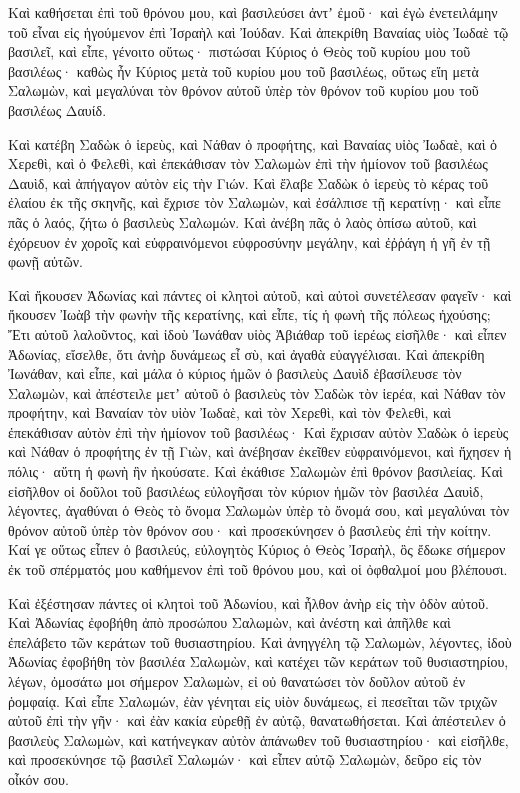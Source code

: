 {Καὶ καθήσεται ἐπὶ τοῦ θρόνου μου, καὶ βασιλεύσει ἀντʼ ἐμοῦ· καὶ ἐγὼ ἐνετειλάμην τοῦ εἶναι εἰς ἡγούμενον ἐπὶ Ἰσραὴλ καὶ Ἰούδαν.
Καὶ ἀπεκρίθη Βαναίας υἱὸς Ἰωδαὲ τῷ βασιλεῖ, καὶ εἶπε, γένοιτο οὕτως· πιστώσαι Κύριος ὁ Θεὸς τοῦ κυρίου μου τοῦ βασιλέως·
καθὼς ἦν Κύριος μετὰ τοῦ κυρίου μου τοῦ βασιλέως, οὕτως εἴη μετὰ Σαλωμὼν, καὶ μεγαλύναι τὸν θρόνον αὐτοῦ ὑπὲρ τὸν θρόνον τοῦ κυρίου μου τοῦ βασιλέως Δαυίδ.
\par }{\PP {}Καὶ κατέβη Σαδὼκ ὁ ἱερεὺς, καὶ Νάθαν ὁ προφήτης, καὶ Βαναίας υἱὸς Ἰωδαὲ, καὶ ὁ Χερεθὶ, καὶ ὁ Φελεθὶ, καὶ ἐπεκάθισαν τὸν Σαλωμὼν ἐπὶ τὴν ἡμίονον τοῦ βασιλέως Δαυὶδ, καὶ ἀπήγαγον αὐτὸν εἰς τὴν Γιών.
Καὶ ἔλαβε Σαδὼκ ὁ ἱερεὺς τὸ κέρας τοῦ ἐλαίου ἐκ τῆς σκηνῆς, καὶ ἔχρισε τὸν Σαλωμὼν, καὶ ἐσάλπισε τῇ κερατίνῃ· καὶ εἶπε πᾶς ὁ λαός, ζήτω ὁ βασιλεὺς Σαλωμών.
Καὶ ἀνέβη πᾶς ὁ λαὸς ὀπίσω αὐτοῦ, καὶ ἐχόρευον ἐν χοροῖς καὶ εὐφραινόμενοι εὐφροσύνην μεγάλην, καὶ ἐῤῥάγη ἡ γῆ ἐν τῇ φωνῇ αὐτῶν.
\par }{\PP {}Καὶ ἤκουσεν Ἀδωνίας καὶ πάντες οἱ κλητοὶ αὐτοῦ, καὶ αὐτοὶ συνετέλεσαν φαγεῖν· καὶ ἤκουσεν Ἰωὰβ τὴν φωνὴν τῆς κερατίνης, καὶ εἶπε, τίς ἡ φωνὴ τῆς πόλεως ἠχούσης;
Ἔτι αὐτοῦ λαλοῦντος, καὶ ἰδοὺ Ἰωνάθαν υἱὸς Ἀβιάθαρ τοῦ ἱερέως εἰσῆλθε· καὶ εἶπεν Ἀδωνίας, εἴσελθε, ὅτι ἀνὴρ δυνάμεως εἶ σὺ, καὶ ἀγαθὰ εὐαγγέλισαι.
Καὶ ἀπεκρίθη Ἰωνάθαν, καὶ εἶπε, καὶ μάλα ὁ κύριος ἡμῶν ὁ βασιλεὺς Δαυὶδ ἐβασίλευσε τὸν Σαλωμὼν,
καὶ ἀπέστειλε μετʼ αὐτοῦ ὁ βασιλεὺς τὸν Σαδὼκ τὸν ἱερέα, καὶ Νάθαν τὸν προφήτην, καὶ Βαναίαν τὸν υἱὸν Ἰωδαὲ, καὶ τὸν Χερεθὶ, καὶ τὸν Φελεθὶ, καὶ ἐπεκάθισαν αὐτὸν ἐπὶ τὴν ἡμίονον τοῦ βασιλέως·
Καὶ ἔχρισαν αὐτὸν Σαδὼκ ὁ ἱερεὺς καὶ Νάθαν ὁ προφήτης ἐν τῇ Γιὼν, καὶ ἀνέβησαν ἐκεῖθεν εὐφραινόμενοι, καὶ ἤχησεν ἡ πόλις· αὕτη ἡ φωνὴ ἣν ἠκούσατε.
Καὶ ἐκάθισε Σαλωμὼν ἐπὶ θρόνον βασιλείας.
Καὶ εἰσῆλθον οἱ δοῦλοι τοῦ βασιλέως εὐλογῆσαι τὸν κύριον ἡμῶν τὸν βασιλέα Δαυὶδ, λέγοντες, ἀγαθύναι ὁ Θεὸς τὸ ὄνομα Σαλωμὼν ὑπὲρ τὸ ὄνομά σου, καὶ μεγαλύναι τὸν θρόνον αὐτοῦ ὑπὲρ τὸν θρόνον σου· καὶ προσεκύνησεν ὁ βασιλεὺς ἐπὶ τὴν κοίτην.
Καί γε οὕτως εἶπεν ὁ βασιλεύς, εὐλογητὸς Κύριος ὁ Θεὸς Ἰσραὴλ, ὃς ἔδωκε σήμερον ἐκ τοῦ σπέρματός μου καθήμενον ἐπὶ τοῦ θρόνου μου, καὶ οἱ ὀφθαλμοί μου βλέπουσι.
\par }{\PP {}Καὶ ἐξέστησαν πάντες οἱ κλητοὶ τοῦ Ἀδωνίου, καὶ ἦλθον ἀνὴρ εἰς τὴν ὁδὸν αὐτοῦ.
Καὶ Ἀδωνίας ἐφοβήθη ἀπὸ προσώπου Σαλωμὼν, καὶ ἀνέστη καὶ ἀπῆλθε καὶ ἐπελάβετο τῶν κεράτων τοῦ θυσιαστηρίου.
Καὶ ἀνηγγέλη τῷ Σαλωμὼν, λέγοντες, ἰδοὺ Ἀδωνίας ἐφοβήθη τὸν βασιλέα Σαλωμὼν, καὶ κατέχει τῶν κεράτων τοῦ θυσιαστηρίου, λέγων, ὀμοσάτω μοι σήμερον Σαλωμὼν, εἰ οὐ θανατώσει τὸν δοῦλον αὐτοῦ ἐν ῥομφαίᾳ.
Καὶ εἶπε Σαλωμών, ἐὰν γένηται εἰς υἱὸν δυνάμεως, εἰ πεσεῖται τῶν τριχῶν αὐτοῦ ἐπὶ τὴν γῆν· καὶ ἐὰν κακία εὑρεθῇ ἐν αὐτῷ, θανατωθήσεται.
Καὶ ἀπέστειλεν ὁ βασιλεὺς Σαλωμὼν, καὶ κατήνεγκαν αὐτὸν ἀπάνωθεν τοῦ θυσιαστηρίου· καὶ εἰσῆλθε, καὶ προσεκύνησε τῷ βασιλεῖ Σαλωμών· καὶ εἶπεν αὐτῷ Σαλωμὼν, δεῦρο εἰς τὸν οἶκόν σου.

}
